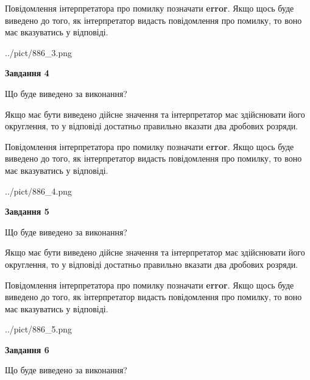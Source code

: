 \documentclass[12pt, ukrainian]{article}
\begin{document}
{\begin {Large}
Повідомлення інтерпретатора про помилку позначати \textbf{error}.
Якщо щось буде виведено до того, як інтерпретатор видасть повідомлення про помилку, 
то воно має вказуватись у відповіді. \par

\begin{center}
	{../pict/886_3.png}
\end{center}
\newpage

{\begin {center}\textbf{Завдання 4}\end {center}}\par
Що буде виведено за виконання? \par

Якщо має бути виведено дійсне значення та інтерпретатор має здійснювати його округлення, 
то у відповіді достатньо правильно вказати два дробових розряди.

Повідомлення інтерпретатора про помилку позначати \textbf{error}.
Якщо щось буде виведено до того, як інтерпретатор видасть повідомлення про помилку, 
то воно має вказуватись у відповіді. \par

\begin{center}
	{../pict/886_4.png}
\end{center}
\newpage

{\begin {center}\textbf{Завдання 5}\end {center}}\par
Що буде виведено за виконання? \par

Якщо має бути виведено дійсне значення та інтерпретатор має здійснювати його округлення, 
то у відповіді достатньо правильно вказати два дробових розряди.

Повідомлення інтерпретатора про помилку позначати \textbf{error}.
Якщо щось буде виведено до того, як інтерпретатор видасть повідомлення про помилку, 
то воно має вказуватись у відповіді. \par

\begin{center}
	{../pict/886_5.png}
\end{center}
\newpage

{\begin {center}\textbf{Завдання 6}\end {center}}\par
Що буде виведено за виконання? \par


\end{Large}}
\end{document}
